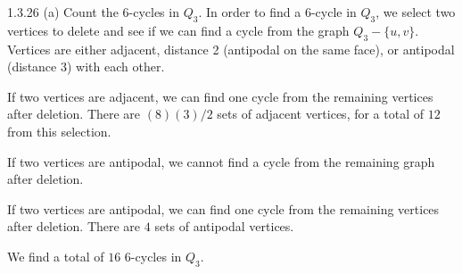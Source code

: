 \documentclass[10pt]{extarticle}
\begin{document}
  \begin{problem}{1.3.26 (a)}
    Count the $6$-cycles in $Q_3$.
    \tcblower
    In order to find a $6$-cycle in $Q_3$, we select two vertices to delete and see if we can find a cycle from the graph $Q_3 - \{u,v\}$. Vertices are either adjacent, distance 2 (antipodal on the same face), or antipodal (distance 3) with each other.
    \begin{description}[font=\normalfont\scshape]
      \item[Adjacent:] If two vertices are adjacent, we can find one cycle from the remaining vertices after deletion. There are $(8)(3)/2$ sets of adjacent vertices, for a total of $12$ from this selection.
      \item[Antipodal on the same face:] If two vertices are antipodal, we cannot find a cycle from the remaining graph after deletion.
      \item[Antipodal:] If two vertices are antipodal, we can find one cycle from the remaining vertices after deletion. There are $4$ sets of antipodal vertices.
    \end{description}
    We find a total of $16$ $6$-cycles in $Q_3$.
  \end{problem}
\end{document}
